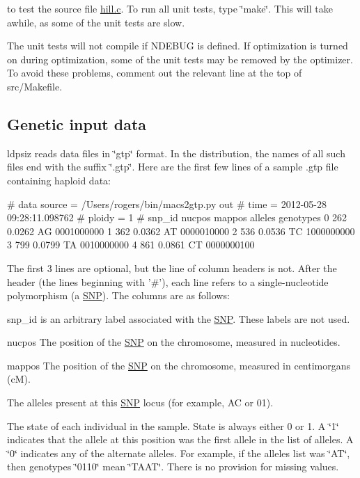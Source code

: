 to test the source file {\ttfamily \hyperlink{hill_8c}{hill.\+c}}. To run all unit tests, type \char`\"{}make\char`\"{}. This will take awhile, as some of the unit tests are slow.

The unit tests will not compile if {\ttfamily N\+D\+E\+B\+U\+G} is defined. If optimization is turned on during optimization, some of the unit tests may be removed by the optimizer. To avoid these problems, comment out the relevant line at the top of src/\+Makefile.

\subsection*{Genetic input data}

{\ttfamily ldpsiz} reads data files in \char`\"{}gtp\char`\"{} format. In the distribution, the names of all such files end with the suffix \char`\"{}.\+gtp\char`\"{}. Here are the first few lines of a sample .gtp file containing haploid data\+: \begin{DoxyVerb}# data source           = /Users/rogers/bin/macs2gtp.py out
# time                  = 2012-05-28 09:28:11.098762
# ploidy                = 1
#   snp_id     nucpos   mappos alleles genotypes
         0        262   0.0262      AG 0001000000
         1        362   0.0362      AT 0000010000
         2        536   0.0536      TC 1000000000
         3        799   0.0799      TA 0010000000
         4        861   0.0861      CT 0000000100
\end{DoxyVerb}


The first 3 lines are optional, but the line of column headers is not. After the header (the lines beginning with '\#'), each line refers to a single-\/nucleotide polymorphism (a \hyperlink{struct_s_n_p}{S\+N\+P}). The columns are as follows\+:


\begin{DoxyEnumerate}
\item snp\+\_\+id is an arbitrary label associated with the \hyperlink{struct_s_n_p}{S\+N\+P}. These labels are not used.
\item nucpos The position of the \hyperlink{struct_s_n_p}{S\+N\+P} on the chromosome, measured in nucleotides.
\item mappos The position of the \hyperlink{struct_s_n_p}{S\+N\+P} on the chromosome, measured in centimorgans (c\+M).
\item The alleles present at this \hyperlink{struct_s_n_p}{S\+N\+P} locus (for example, A\+C or 01).
\item The state of each individual in the sample. State is always either 0 or 1. A \char`\"{}1\char`\"{} indicates that the allele at this position was the first allele in the list of alleles. A \char`\"{}0\char`\"{} indicates any of the alternate alleles. For example, if the alleles list was \char`\"{}\+A\+T\char`\"{}, then genotypes \char`\"{}0110\char`\"{} mean \char`\"{}\+T\+A\+A\+T\char`\"{}. There is no provision for missing values.
\end{DoxyEnumerate}

